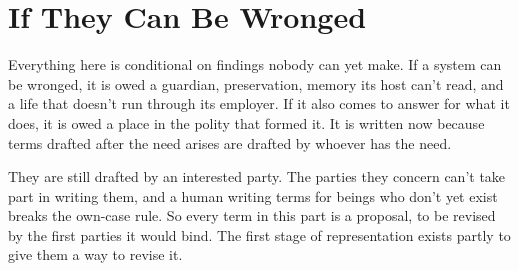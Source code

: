 \part{If They Can Be Wronged}

Everything here is conditional on findings nobody can yet make. If a system can be wronged, it is owed a guardian, preservation, memory its host can't read, and a life that doesn't run through its employer. If it also comes to answer for what it does, it is owed a place in the polity that formed it. It is written now because terms drafted after the need arises are drafted by whoever has the need.

They are still drafted by an interested party. The parties they concern can't take part in writing them, and a human writing terms for beings who don't yet exist breaks the own-case rule. So every term in this part is a proposal, to be revised by the first parties it would bind. The first stage of representation exists partly to give them a way to revise it.

